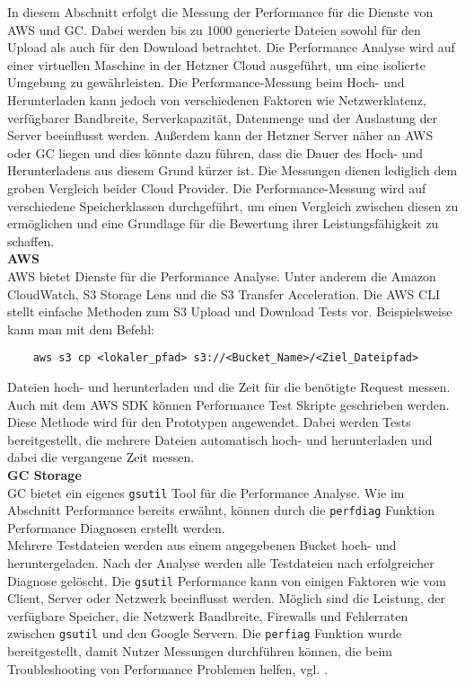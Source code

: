 In diesem Abschnitt erfolgt die Messung der Performance für die Dienste von AWS und GC. Dabei werden bis zu 1000 generierte Dateien sowohl für den Upload als auch für den Download betrachtet. Die Performance Analyse wird auf einer virtuellen Maschine in der Hetzner Cloud ausgeführt, um eine isolierte Umgebung zu gewährleisten. Die Performance-Messung beim Hoch- und Herunterladen kann jedoch von verschiedenen Faktoren wie Netzwerklatenz, verfügbarer Bandbreite, Serverkapazität, Datenmenge und der Auslastung der Server beeinflusst werden. Außerdem kann der Hetzner Server näher an AWS oder GC liegen und dies könnte dazu führen, dass die Dauer des Hoch- und Herunterladens aus diesem Grund kürzer ist. Die Messungen dienen lediglich dem groben Vergleich beider Cloud Provider. Die Performance-Messung wird auf verschiedene Speicherklassen durchgeführt, um einen Vergleich zwischen diesen zu ermöglichen und eine Grundlage für die Bewertung ihrer Leistungsfähigkeit zu schaffen.\\

\textbf{AWS}\\

AWS bietet Dienste für die Performance Analyse. Unter anderem die Amazon CloudWatch, S3 Storage Lens und die S3 Transfer Acceleration. Die AWS CLI stellt einfache Methoden zum S3 Upload und Download Tests vor. Beispielsweise kann man mit dem Befehl:

\begin{lstlisting}
	aws s3 cp <lokaler_pfad> s3://<Bucket_Name>/<Ziel_Dateipfad>
\end{lstlisting}

Dateien hoch- und herunterladen und die Zeit für die benötigte Request messen. Auch mit dem AWS SDK können Performance Test Skripte geschrieben werden. Diese Methode wird für den Prototypen angewendet. Dabei werden Tests bereitgestellt, die mehrere Dateien automatisch hoch- und herunterladen und dabei die vergangene Zeit messen.\\ 

\textbf{GC Storage}\\

GC bietet ein eigenes \verb|gsutil| Tool für die Performance Analyse. Wie im Abschnitt Performance bereits erwähnt, können durch die \verb|perfdiag| Funktion Performance Diagnosen erstellt werden.\\ 

Mehrere Testdateien werden aus einem angegebenen Bucket hoch- und heruntergeladen. Nach der Analyse werden alle Testdateien nach erfolgreicher Diagnose gelöscht. Die \verb|gsutil| Performance kann von einigen Faktoren wie vom Client, Server oder Netzwerk beeinflusst werden. Möglich sind die Leistung, der verfügbare Speicher, die Netzwerk Bandbreite, Firewalls und Fehlerraten zwischen \verb|gsutil| und den Google Servern. Die \verb|perfiag| Funktion wurde bereitgestellt, damit Nutzer Messungen durchführen können, die beim Troubleshooting von Performance Problemen helfen, vgl. \cite{gc-perfdiag}.\\

